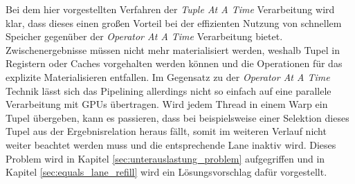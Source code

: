 Bei dem hier vorgestellten Verfahren der \emph{Tuple At A Time} Verarbeitung wird klar, dass dieses einen großen Vorteil bei der effizienten Nutzung von schnellem Speicher gegenüber der \emph{Operator At A Time} Verarbeitung bietet.
Zwischenergebnisse müssen nicht mehr materialisiert werden, weshalb Tupel in Registern oder Caches vorgehalten werden können und die Operationen für das explizite Materialisieren entfallen.
Im Gegensatz zu der \emph{Operator At A Time} Technik lässt sich das Pipelining allerdings nicht so einfach auf eine parallele Verarbeitung mit GPUs übertragen.
Wird jedem Thread in einem Warp ein Tupel übergeben, kann es passieren, dass bei beispielsweise einer Selektion dieses Tupel aus der Ergebnisrelation heraus fällt, somit im weiteren Verlauf nicht weiter beachtet werden muss und die entsprechende Lane inaktiv wird.
Dieses Problem wird in Kapitel \ref{sec:unterauslastung_problem} aufgegriffen und in Kapitel \ref{sec:equals_lane_refill} wird ein Lösungsvorschlag dafür vorgestellt.